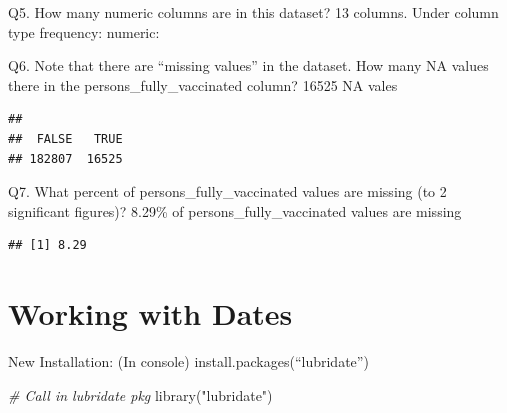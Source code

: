 \documentclass[
]{article}
\newenvironment{Shaded}{\begin{snugshade}}{\end{snugshade}}
\newcommand{\CommentTok}[1]{\textcolor[rgb]{0.56,0.35,0.01}{\textit{#1}}}
\newcommand{\DecValTok}[1]{\textcolor[rgb]{0.00,0.00,0.81}{#1}}
\newcommand{\FunctionTok}[1]{\textcolor[rgb]{0.00,0.00,0.00}{#1}}
\newcommand{\NormalTok}[1]{#1}
\newcommand{\OtherTok}[1]{\textcolor[rgb]{0.56,0.35,0.01}{#1}}
\newcommand{\SpecialCharTok}[1]{\textcolor[rgb]{0.00,0.00,0.00}{#1}}
\newcommand{\StringTok}[1]{\textcolor[rgb]{0.31,0.60,0.02}{#1}}
\begin{document}
Q5. How many numeric columns are in this dataset? 13 columns. Under
column type frequency: numeric:

Q6. Note that there are ``missing values'' in the dataset. How many NA
values there in the persons\_fully\_vaccinated column? 16525 NA vales

\begin{Shaded}
\end{Shaded}

\begin{verbatim}
## 
##  FALSE   TRUE 
## 182807  16525
\end{verbatim}

Q7. What percent of persons\_fully\_vaccinated values are missing (to 2
significant figures)? 8.29\% of persons\_fully\_vaccinated values are
missing

\begin{Shaded}
\end{Shaded}

\begin{verbatim}
## [1] 8.29
\end{verbatim}

\hypertarget{working-with-dates}{%
\section{Working with Dates}\label{working-with-dates}}

New Installation: (In console) install.packages(``lubridate'')

\begin{Shaded}
\begin{Highlighting}[]
\CommentTok{\# Call in lubridate pkg}
\FunctionTok{library}\NormalTok{(}\StringTok{"lubridate"}\NormalTok{)}
\end{Highlighting}
\end{Shaded}
\end{document}
